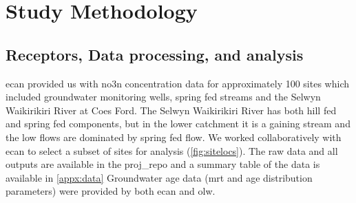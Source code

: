 
\section[Methods]{Study Methodology}   \label{sec:methods}

\subsection[Data]{Receptors, Data processing, and analysis} \label{sec:data}

\gls{ecan} provided us with \gls{no3n} concentration data for approximately 100 sites which included groundwater monitoring wells, spring fed streams and the Selwyn Waikirikiri River at Coes Ford. The Selwyn Waikirikiri River has both hill fed and spring fed components, but in the lower catchment it is a gaining stream and the low flows are dominated by spring fed flow. We worked collaboratively with \gls{ecan} to select a subset of sites for analysis (\autoref{fig:sitelocs}). The raw data and all outputs are available in the \gls{proj_repo} and a summary table of the data is available in \autoref{appx:data} Groundwater age data (\gls{mrt} and age distribution parameters) were provided by both \gls{ecan} and \gls{olw}.

\begin{landscape}
\end{landscape}

